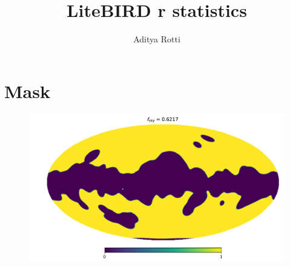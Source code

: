 \documentclass[11pt]{article}
\begin{document}
\title{LiteBIRD r statistics}
\author{Aditya Rotti}
\date{}
\maketitle


\newpage


\newpage
\section{Mask}
\begin{figure}
\centering
\includegraphics[width=1.2\textwidth]{mask.pdf}
\end{figure}
\end{document}
